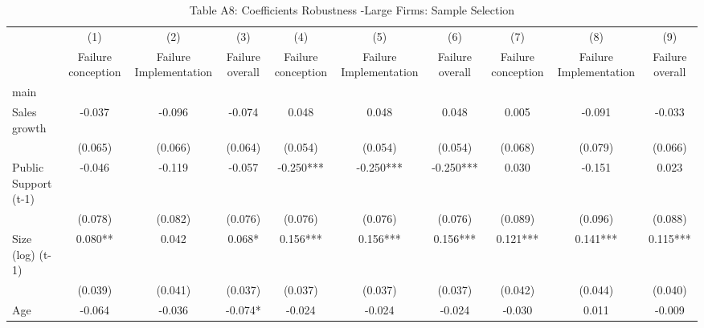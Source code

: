\begin{table}[htbp]\centering
\def\sym#1{\ifmmode^{#1}\else\(^{#1}\)\fi}
\caption{{Table A8: Coefficients Robustness -Large Firms: Sample Selection}}
\begin{tabular}{l*{9}{c}}
\hline\hline
                    &\multicolumn{1}{c}{(1)}&\multicolumn{1}{c}{(2)}&\multicolumn{1}{c}{(3)}&\multicolumn{1}{c}{(4)}&\multicolumn{1}{c}{(5)}&\multicolumn{1}{c}{(6)}&\multicolumn{1}{c}{(7)}&\multicolumn{1}{c}{(8)}&\multicolumn{1}{c}{(9)}\\
                    &\multicolumn{1}{c}{Failure conception}&\multicolumn{1}{c}{Failure Implementation}&\multicolumn{1}{c}{Failure overall}&\multicolumn{1}{c}{Failure conception}&\multicolumn{1}{c}{Failure Implementation}&\multicolumn{1}{c}{Failure overall}&\multicolumn{1}{c}{Failure conception}&\multicolumn{1}{c}{Failure Implementation}&\multicolumn{1}{c}{Failure overall}\\
\hline
main                &               &               &               &               &               &               &               &               &               \\
Sales growth        &      -0.037   &      -0.096   &      -0.074   &       0.048   &       0.048   &       0.048   &       0.005   &      -0.091   &      -0.033   \\
                    &     (0.065)   &     (0.066)   &     (0.064)   &     (0.054)   &     (0.054)   &     (0.054)   &     (0.068)   &     (0.079)   &     (0.066)   \\
Public Support (t-1)&      -0.046   &      -0.119   &      -0.057   &      -0.250***&      -0.250***&      -0.250***&       0.030   &      -0.151   &       0.023   \\
                    &     (0.078)   &     (0.082)   &     (0.076)   &     (0.076)   &     (0.076)   &     (0.076)   &     (0.089)   &     (0.096)   &     (0.088)   \\
Size (log) (t-1)    &       0.080** &       0.042   &       0.068*  &       0.156***&       0.156***&       0.156***&       0.121***&       0.141***&       0.115***\\
                    &     (0.039)   &     (0.041)   &     (0.037)   &     (0.037)   &     (0.037)   &     (0.037)   &     (0.042)   &     (0.044)   &     (0.040)   \\
Age                 &      -0.064   &      -0.036   &      -0.074*  &      -0.024   &      -0.024   &      -0.024   &      -0.030   &       0.011   &      -0.009   \\

\end{tabular}
\end{table}
